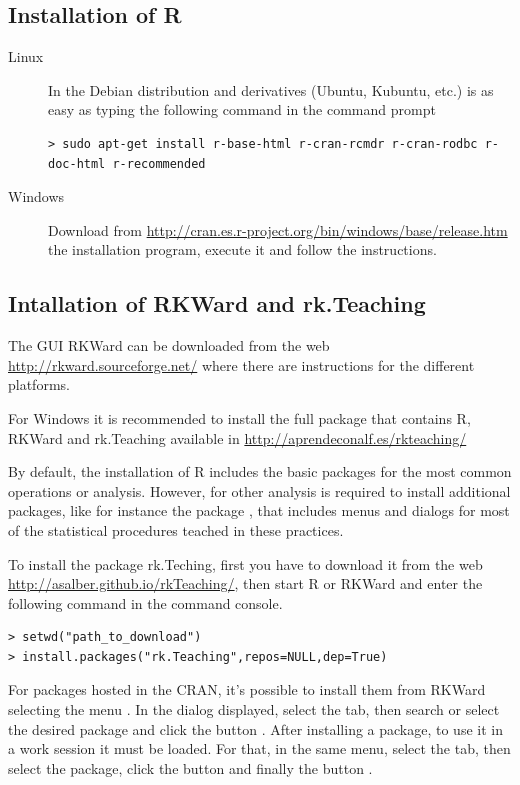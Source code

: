 \subsection{Installation of R}
\begin{description}
\item[Linux] In the Debian distribution and derivatives (Ubuntu, Kubuntu, etc.) is as easy as typing the following
command in the command prompt
\begin{lstlisting}
> sudo apt-get install r-base-html r-cran-rcmdr r-cran-rodbc r-doc-html r-recommended
\end{lstlisting}
\item[Windows] Download from \url{http://cran.es.r-project.org/bin/windows/base/release.htm} the installation program,
execute it and follow the instructions. 
\end{description}

\subsection{Intallation of RKWard and rk.Teaching}
The GUI RKWard can be downloaded from the web \url{http://rkward.sourceforge.net/} where there are instructions for
the different platforms.

For Windows it is recommended to install the full package that contains R, RKWard and rk.Teaching available in  
\url{http://aprendeconalf.es/rkteaching/}

By default, the installation of R includes the basic packages for the most common operations or analysis.
However, for other analysis is required to install additional packages, like for instance the package
, that includes menus and dialogs for most of the statistical procedures teached in these
practices. 

To install the package rk.Teching, first you have to download it from the web
\url{http://asalber.github.io/rkTeaching/}, then start R or RKWard and enter the following command in the command
console.
\begin{lstlisting}
> setwd("path_to_download")
> install.packages("rk.Teaching",repos=NULL,dep=True)
\end{lstlisting}

For packages hosted in the CRAN, it's possible to install them from RKWard selecting the
menu .
In the dialog displayed, select the  tab, then search or select the desired
package and click the button .
After installing a package, to use it in a work session it must be loaded. 
For that, in the same menu, select the  tab, then select the package, click the button
 and finally the button .


